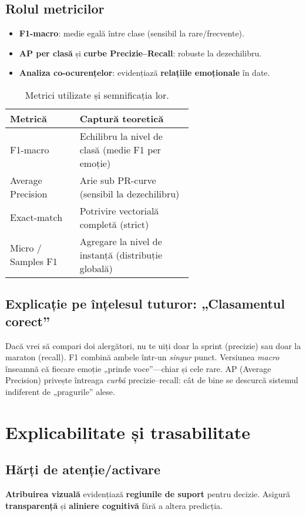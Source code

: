 \subsection{Rolul metricilor}
\begin{itemize}
  \item \textbf{F1-macro}: medie egală între clase (sensibil la rare/frecvente).
  \item \textbf{AP per clasă} și \textbf{curbe Precizie–Recall}: robuste la dezechilibru.
  \item \textbf{Analiza co-ocurențelor}: evidențiază \textbf{relațiile emoționale} în date.
\end{itemize}

\begin{table}[h]
\centering
\begin{tabular}{l p{0.62\linewidth}}
\hline
\textbf{Metrică} & \textbf{Captură teoretică} \\
\hline
F1-macro & Echilibru la nivel de clasă (medie F1 per emoție) \\
Average Precision & Arie sub PR-curve (sensibil la dezechilibru) \\
Exact-match & Potrivire vectorială completă (strict) \\
Micro / Samples F1 & Agregare la nivel de instanță (distribuție globală) \\
\hline
\end{tabular}
\caption{Metrici utilizate și semnificația lor.}
\label{tab:metrici}
\end{table}

\subsection{Explicație pe înțelesul tuturor: „Clasamentul corect”}
Dacă vrei să compari doi alergători, nu te uiți doar la sprint (precizie) sau doar la maraton (recall). F1 combină ambele într-un \emph{singur} punct. Versiunea \emph{macro} înseamnă că fiecare emoție „prinde voce”—chiar și cele rare. AP (Average Precision) privește întreaga \emph{curbă} precizie–recall: cât de bine se descurcă sistemul indiferent de „pragurile” alese.

\section{Explicabilitate și trasabilitate}
\label{sec:xai}

\subsection{Hărți de atenție/activare}
\textbf{Atribuirea vizuală} evidențiază \textbf{regiunile de suport} pentru decizie. Asigură \textbf{transparență} și \textbf{aliniere cognitivă} fără a altera predicția.

